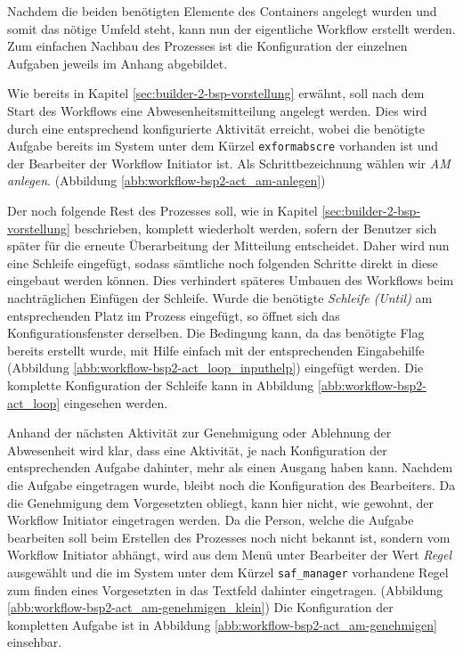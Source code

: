 Nachdem die beiden benötigten Elemente des Containers angelegt wurden und somit das nötige Umfeld steht, kann nun der eigentliche Workflow erstellt werden. Zum einfachen Nachbau des Prozesses ist die Konfiguration der einzelnen Aufgaben jeweils im Anhang abgebildet. 

Wie bereits in Kapitel \ref{sec:builder-2-bsp-vorstellung} erwähnt, soll nach dem Start des Workflows eine Abwesenheitsmitteilung angelegt werden. Dies wird durch eine entsprechend konfigurierte Aktivität erreicht, wobei die benötigte Aufgabe bereits im System unter dem Kürzel \texttt{exformabscre} vorhanden ist und der Bearbeiter der Workflow Initiator ist. Als Schrittbezeichnung wählen wir \textit{AM anlegen}. (Abbildung \ref{abb:workflow-bsp2-act_am-anlegen})

Der noch folgende Rest des Prozesses soll, wie in Kapitel \ref{sec:builder-2-bsp-vorstellung} beschrieben, komplett wiederholt werden, sofern der Benutzer sich später für die erneute Überarbeitung der Mitteilung entscheidet. Daher wird nun eine Schleife eingefügt, sodass sämtliche noch folgenden Schritte direkt in diese eingebaut werden können. Dies verhindert späteres Umbauen des Workflows beim nachträglichen Einfügen der Schleife. Wurde die benötigte \textit{Schleife (Until)} am entsprechenden Platz im Prozess eingefügt, so öffnet sich das Konfigurationsfenster derselben. Die Bedingung kann, da das benötigte Flag bereits erstellt wurde, mit Hilfe einfach mit der entsprechenden Eingabehilfe (Abbildung \ref{abb:workflow-bsp2-act_loop_inputhelp}) eingefügt werden. Die komplette Konfiguration der Schleife kann in Abbildung \ref{abb:workflow-bsp2-act_loop} eingesehen werden.

Anhand der nächsten Aktivität zur Genehmigung oder Ablehnung der Abwesenheit wird klar, dass eine Aktivität, je nach Konfiguration der entsprechenden Aufgabe dahinter, mehr als einen Ausgang haben kann. Nachdem die Aufgabe eingetragen wurde, bleibt noch die Konfiguration des Bearbeiters. Da die Genehmigung dem Vorgesetzten obliegt, kann hier nicht, wie gewohnt, der Workflow Initiator eingetragen werden. Da die Person, welche die Aufgabe bearbeiten soll beim Erstellen des Prozesses noch nicht bekannt ist, sondern vom Workflow Initiator abhängt, wird aus dem Menü unter Bearbeiter der Wert \textit{Regel} ausgewählt und die im System unter dem Kürzel \texttt{saf\_manager} vorhandene Regel zum finden eines Vorgesetzten in das Textfeld dahinter eingetragen. (Abbildung \ref{abb:workflow-bsp2-act_am-genehmigen_klein}) Die Konfiguration der kompletten Aufgabe ist in Abbildung \ref{abb:workflow-bsp2-act_am-genehmigen} einsehbar.

